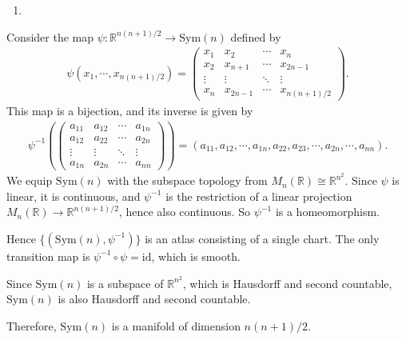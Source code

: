 \begin{enumerate}
    \item [1.]
\end{enumerate}
Consider the map $\psi:\mathbb{R}^{n(n+1)/2}\to \mathrm{Sym}(n)$ defined by 
\begin{align}
    \psi(x_1,\cdots,x_{n(n+1)/2})=\begin{pmatrix}
        x_1 & x_2 & \cdots & x_n\\
        x_2 & x_{n+1} & \cdots & x_{2n-1}\\
        \vdots & \vdots & \ddots & \vdots\\
        x_n & x_{2n-1} & \cdots & x_{n(n+1)/2}
    \end{pmatrix}.
\end{align}
This map is a bijection, and its inverse is given by
\begin{align}
    \psi^{-1}\left(\begin{pmatrix}
        a_{11} & a_{12} & \cdots & a_{1n}\\
        a_{12} & a_{22} & \cdots & a_{2n}\\
        \vdots & \vdots & \ddots & \vdots\\
        a_{1n} & a_{2n} & \cdots & a_{nn}
    \end{pmatrix}\right)=(a_{11},a_{12},\cdots,a_{1n},a_{22},a_{23},\cdots,a_{2n},\cdots,a_{nn}).
\end{align}
We equip $\mathrm{Sym}(n)$ with the subspace topology from $M_n(\mathbb{R})\cong\mathbb{R}^{n^2}$. Since $\psi$ is linear, it is continuous, and $\psi^{-1}$ is the restriction of a linear projection $M_n(\mathbb{R})\to\mathbb{R}^{n(n+1)/2}$, hence also continuous. So $\psi^{-1}$ is a homeomorphism.

Hence $\{(\mathrm{Sym}(n),\psi^{-1})\}$ is an atlas consisting of a single chart. The only transition map is $\psi^{-1}\circ\psi=\mathrm{id}$, which is smooth.

Since $\mathrm{Sym}(n)$ is a subspace of $\mathbb{R}^{n^2}$, which is Hausdorff and second countable, $\mathrm{Sym}(n)$ is also Hausdorff and second countable.

Therefore, $\mathrm{Sym}(n)$ is a manifold of dimension $n(n+1)/2$.


